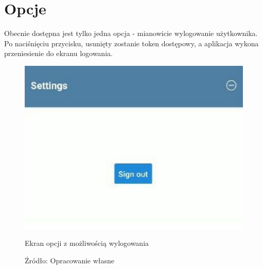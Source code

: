\section{Opcje}
Obecnie dostępna jest tylko jedna opcja - mianowicie wylogowanie użytkownika. Po naciśnięciu przycisku, usunięty zostanie token dostępowy, a aplikacja wykona przeniesienie do ekranu logowania.
\begin{figure}[H]
	\centering
	\includegraphics{options.pdf}
	\caption{\centering Ekran opcji z możliwością wylogowania}
	\caption*{\centering Źródło: {Opracowanie własne}}
\end{figure}

